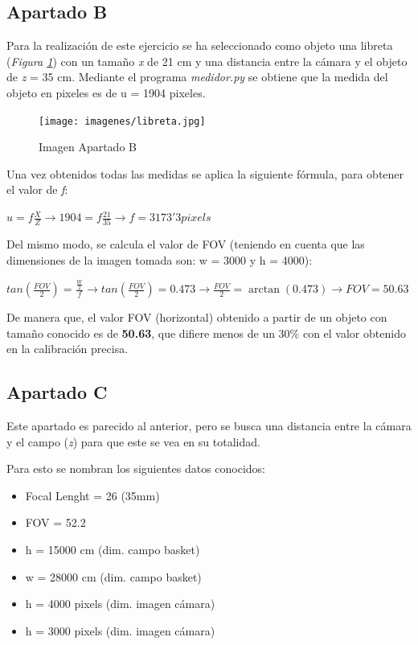 \documentclass[a4paper]{article} %
\begin{document}
\newpage
\subsection{Apartado B}

Para la realización de este ejercicio se ha seleccionado como objeto una libreta (\textit{Figura \ref{fig:libreta}}) con un tamaño \textit{x} de 21 cm y una distancia entre la cámara y el objeto de \textit{z} = 35 cm. Mediante el programa \textit{medidor.py} se obtiene que la medida del objeto en pixeles es de u = 1904 pixeles.

\vspace{0.3cm}

\begin{figure}[htp]
	\centering
	\texttt{[image: imagenes/libreta.jpg]}
	\caption{Imagen Apartado B}
	\label{fig:libreta}
\end{figure}

Una vez obtenidos todas las medidas se aplica la siguiente fórmula, para obtener el valor de \textit{f}:
\begin{center}
	$u = \textit{f} \frac{X}{Z} \rightarrow 1904 = \textit{f} \frac{21}{35} \rightarrow \textit{f} = 3173'3 pixels$
\end{center}

Del mismo modo, se calcula el valor de FOV (teniendo en cuenta que las dimensiones de la imagen tomada son: w = 3000 y h = 4000):

\begin{center}
	$tan(\frac{FOV}{2}) = \frac{\frac{W}{2}}{\textit{f}} \rightarrow tan(\frac{FOV}{2}) = 0.473 \rightarrow \frac{FOV}{2} = \arctan (0.473) \rightarrow FOV = 50.63$
\end{center}

De manera que, el valor FOV (horizontal) obtenido a partir de un objeto con tamaño conocido es de \textbf{50.63}, que difiere menos de un 30\% con el valor obtenido en la calibración precisa.

\subsection{Apartado C}

Este apartado es parecido al anterior, pero se busca una distancia entre la cámara y el campo (\textit{z}) para que este se vea en su totalidad.

Para esto se nombran los siguientes datos conocidos:
\begin{itemize}
	\item Focal Lenght = 26 (35mm)
	\item FOV = 52.2
	\item h = 15000 cm (dim. campo basket)
	\item w = 28000 cm (dim. campo basket)
	\item h = 4000 pixels (dim. imagen cámara)
	\item h = 3000 pixels (dim. imagen cámara)
\end{itemize}
\end{document}
